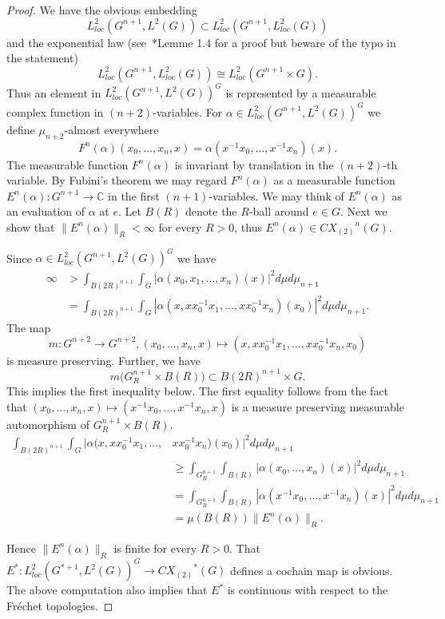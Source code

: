 \documentclass[10pt]{amsart}
\theoremstyle{plain}
\theoremstyle{definition}
\theoremstyle{remark}
\begin{document}
\begin{proof}
We have the obvious embedding 
\[{L^2_{loc}}(G^{n+1}, L^2(G))\subset {L^2_{loc}}(G^{n+1}, {L^2_{loc}}(G))\] 
and the exponential law (see~\cite{blanc}*{Lemme 1.4} for a proof but beware of the typo in the statement)
\[ {L^2_{loc}}(G^{n+1}, {L^2_{loc}}(G))\cong {L^2_{loc}}(G^{n+1}\times G).\]
Thus an element in ${L^2_{loc}}(G^{n+1}, L^2(G))^G$ is represented by a 
measurable complex function in $(n+2)$-variables. 
For $\alpha\in {L^2_{loc}}(G^{n+1}, L^2(G))^G$ we define $\mu_{n+2}$-almost everywhere 
\[F^{n}(\alpha)(x_0,\ldots, x_n, x)=\alpha(x^{-1}x_0,\ldots, x^{-1}x_n)(x).\]
The measurable function $F^{n}(\alpha)$ is invariant by translation in the $(n+2)$-th variable. 
By Fubini's theorem we may regard $F^{n}(\alpha)$ as 
a measurable function $E^{n}(\alpha)\colon G^{n+1}\to{{\mathbb C}}$ in the first $(n+1)$-variables. We may think of $E^n(\alpha)$ as an evaluation of $\alpha$ at $e$. 
Let $B(R)$ denote the $R$-ball around $e\in G$. 
Next we show 
that $\|E^n(\alpha)\|_R<\infty$ for every $R>0$, thus $E^n(\alpha)\in {CX_{(2)}}^n(G)$. 

Since $\alpha\in {L^2_{loc}}(G^{n+1}, L^2(G))^G$ we have 
\begin{align*}
 \infty&>	 \int_{B(2R)^{n+1}} \int_{G}
		 |\alpha(x_0,x_1,...,x_n)(x)|^2d\mu d\mu_{n+1}\\
	   &= \int_{B(2R)^{n+1}} \int_{G}
		 |\alpha(x,xx_0^{-1}x_1,...,xx_0^{-1}x_n)(x_0)|^2d\mu d\mu_{n+1}.
\end{align*}
The map 
\[m\colon G^{n+2}\to G^{n+2}, (x_0,\ldots, x_n, x)\mapsto (x, xx_0^{-1}x_1, \ldots, xx_0^{-1}x_n, x_0)\]
is measure preserving. Further, we have 
\[ m\bigl( G_R^{n+1}\times B(R)\bigr)\subset B(2R)^{n+1}\times G.\] 
This implies the first inequality below. The first equality follows from the fact that $(x_0,\dots, x_n,x)\mapsto (x^{-1}x_0, \dots, x^{-1}x_n,x)$ is a measure preserving measurable automorphism of $G_R^{n+1}\times B(R)$. 
\begin{align*}
	   \int_{B(2R)^{n+1}} \int_{G}
		 |\alpha(x,xx_0^{-1}x_1,...,&xx_0^{-1}x_n)(x_0)|^2d\mu d\mu_{n+1}\\
	   &\ge \int_{G_R^{n+1}}\int_{B(R)} |\alpha(x_0, \dots, x_n)(x)|^2d\mu d\mu_{n+1} \\
	   &=\int_{G_R^{n+1}}\int_{B(R)} |\alpha(x^{-1}x_0, \dots, x^{-1}x_n)(x)|^2d\mu d\mu_{n+1} \\
	   &=\mu(B(R))\|E^n(\alpha)\|_R.
\end{align*}

Hence $\|E^n(\alpha)\|_R$ is finite for every $R>0$. 
That $E^\ast\colon {L^2_{loc}}(G^{\ast+1}, L^2(G))^G\to {CX_{(2)}}^\ast(G)$ defines a cochain map is obvious. The above computation also implies that 
$E^\ast$ is continuous with respect to the Fr\'{e}chet topologies. 


\end{proof}
\end{document}
